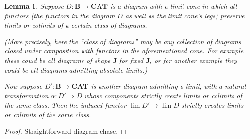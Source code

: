 \documentclass[11pt, oneside, article]{memoir}
\theoremstyle{plain}
\newtheorem{lemma}[theorem]{Lemma}
\theoremstyle{definition}
\theoremstyle{remark}
\newcommand{\namedcat}[1]{\mathbf{#1}}
\newcommand{\cat}[1]{\mathbf{#1}}
\newcommand{\CAT}{\namedcat{CAT}}
\newcommand{\bB}{\cat{B}}
\newcommand{\bJ}{\cat{J}}
\begin{document}
\begin{lemma}\label{lem:inducedcreation}
  Suppose $D \colon \bB \to \CAT$ is a diagram with a limit cone in
  which all functors (the functors in the diagram $D$ as well as the
  limit cone's legs) preserve limits or colimits of a certain class of
  diagrams.

  (More precisely, here the ``class of diagrams'' may be any
  collection of diagrams closed under composition with functors in the
  aforementioned cone. For example these could be all diagrams of
  shape $\bJ$ for fixed $\bJ$, or for another example they could be
  all diagrams admitting absolute limits.)

  Now suppose $D' \colon \bB \to \CAT$ is another diagram admitting
  a limit, with a natural transformation
  $\alpha \colon D' \Rightarrow D$ whose components strictly create
  limits or colimits of the same class. Then the induced functor
  $\lim D' \to \lim D$ strictly creates limits or colimits of the
  same class.
\end{lemma}
\begin{proof}
  Straightforward diagram chase.
\end{proof}
\end{document}
